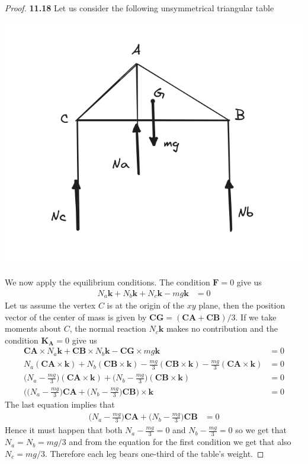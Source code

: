 \documentclass[11pt]{article}
\theoremstyle{definition}
\begin{document}
\begin{proof}{\textbf{11.18}}
    Let us consider the following unsymmetrical triangular table
    \begin{center}
        \includegraphics[scale=0.45]{ch11-18.png}
    \end{center}
    We now apply the equilibrium conditions. The condition $\bm{F} =0$ give us
    \begin{align*}
        N_a\bm{k} + N_b\bm{k} + N_c\bm{k} -mg\bm{k} &= 0
    \end{align*}
    Let us assume the vertex $C$ is at the origin of the $xy$ plane, then the
    position vector of the center of mass is given by
    $\bm{CG} = (\bm{CA} + \bm{CB})/3$.
    If we take moments about $C$, the normal reaction $N_c\bm{k}$ makes no
    contribution and the condition $\bm{K_A} = 0$ give us
    \begin{align*}
        \bm{CA}\times N_a\bm{k} + \bm{CB}\times N_b\bm{k}
        -\bm{CG}\times mg\bm{k} &= 0\\
        N_a(\bm{CA}\times \bm{k}) + N_b(\bm{CB}\times \bm{k})
        -\frac{mg}{3}(\bm{CB}\times \bm{k}) -\frac{mg}{3}(\bm{CA}\times \bm{k}) &= 0\\
        \bigg(N_a-\frac{mg}{3}\bigg)(\bm{CA}\times \bm{k}) + 
        \bigg(N_b-\frac{mg}{3}\bigg)(\bm{CB}\times \bm{k})&= 0\\
        \bigg(\bigg(N_a-\frac{mg}{3}\bigg)\bm{CA} + 
        \bigg(N_b-\frac{mg}{3}\bigg)\bm{CB}\bigg)\times \bm{k}&= 0
    \end{align*}
    The last equation implies that 
    \begin{align*}
        \bigg(N_a-\frac{mg}{3}\bigg)\bm{CA} + 
        \bigg(N_b-\frac{mg}{3}\bigg)\bm{CB}&= 0
    \end{align*}
    Hence it must happen that both $N_a-\frac{mg}{3} = 0$ and
    $N_b-\frac{mg}{3} = 0$ so we get that $N_a = N_b = mg/3$ and from 
    the equation for the first condition we get that also $N_c = mg/3$.
    Therefore each leg bears one-third of the table's weight.
\end{proof}
\end{document}
